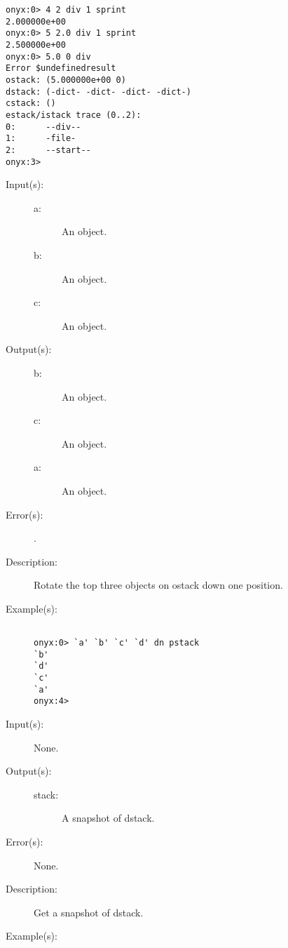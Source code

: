 \begin{description}
\begin{description}
\begin{verbatim}
onyx:0> 4 2 div 1 sprint
2.000000e+00
onyx:0> 5 2.0 div 1 sprint
2.500000e+00
onyx:0> 5.0 0 div
Error $undefinedresult
ostack: (5.000000e+00 0)
dstack: (-dict- -dict- -dict- -dict-)
cstack: ()
estack/istack trace (0..2):
0:      --div--
1:      -file-
2:      --start--
onyx:3>
		\end{verbatim}
	\end{description}
\label{systemdict:dn}
\item[{\onyxop{a b c}{dn}{b c a}}: ]
	\begin{description}\item[]
	\item[Input(s): ]
		\begin{description}\item[]
		\item[a: ]
			An object.
		\item[b: ]
			An object.
		\item[c: ]
			An object.
		\end{description}
	\item[Output(s): ]
		\begin{description}\item[]
		\item[b: ]
			An object.
		\item[c: ]
			An object.
		\item[a: ]
			An object.
		\end{description}
	\item[Error(s): ]
		\begin{description}\item[]
		\item[.]
		\end{description}
	\item[Description: ]
		Rotate the top three objects on ostack down one position.
	\item[Example(s): ]\begin{verbatim}

onyx:0> `a' `b' `c' `d' dn pstack
`b'
`d'
`c'
`a'
onyx:4>
		\end{verbatim}
	\end{description}
\label{systemdict:dstack}
\item[{\onyxop{--}{dstack}{stack}}: ]
	\begin{description}\item[]
	\item[Input(s): ] None.
	\item[Output(s): ]
		\begin{description}\item[]
		\item[stack: ]
			A snapshot of dstack.
		\end{description}
	\item[Error(s): ] None.
	\item[Description: ]
		Get a snapshot of dstack.
	\item[Example(s): ]\begin{verbatim}


\end{verbatim}
\end{description}
\end{description}
